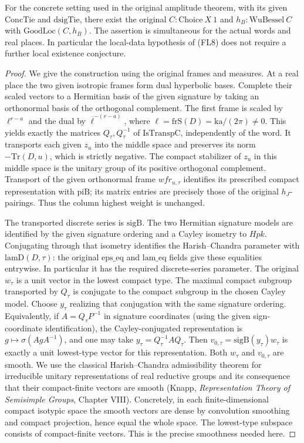\begin{theorem}
\label{thm:flag-local-data}
For the concrete setting used in the original amplitude
theorem, with its given \(\mathrm{ConcTie}\) and
\(\mathrm{dsigTie}\), there exist the original
\(C:\mathrm{Choice}\ X\ 1\) and \(h_B:\mathrm{WuBessel}\ C\)
with \(\mathrm{GoodLoc}(C,h_B)\).
The assertion is simultaneous for the actual words and real
places. In particular the local-data hypothesis of (FL8)
does not require a further local existence conjecture.
\end{theorem}
\begin{proof}
We give the construction using the original frames and measures.
At a real place the two given isotropic frames form dual
hyperbolic bases. Complete their scaled vectors to a Hermitian
basis of the given signature by taking an orthonormal basis
of the orthogonal complement. The first frame is scaled
by \(\ell^{r-a}\) and the dual by
\(\overline{\ell}^{-(r-a)}\), where
\(\ell=\mathrm{frS}(D)=\mathrm{ka}/(2\pi)\ne0\).
This yields exactly the matrices \(Q_\tau,Q_\tau^{-1}\)
of \(\mathrm{IsTranspC}\), independently of the word.
It transports each given \(z_u\) into the middle space
and preserves its norm \(-\mathrm{Tr}(D,u)\), which is
strictly negative. The compact stabilizer of \(z_u\)
in this middle space is the unitary group of its positive
orthogonal complement. Transport of the given orthonormal
frame \(wfr_{u,\tau}\) identifies its prescribed compact
representation with \(\mathrm{piB}\); its matrix entries
are precisely those of the original \(h_J\)-pairings.
Thus the column highest weight is unchanged.

The transported discrete series is \(\mathrm{sigB}\).
The two Hermitian signature models are identified by the
given signature ordering and a Cayley isometry to \(Hpk\).
Conjugating through that isometry identifies the
Harish--Chandra parameter with \(\mathrm{lamD}(D,\tau)\):
the original \(\mathrm{eps\_eq}\) and
\(\mathrm{lam\_eq}\) fields give these equalities entrywise.
In particular it has the required discrete-series parameter.
The original \(w_\tau\) is a unit vector in the lowest
compact type. The maximal compact subgroup transported
by \(Q_\tau\) is conjugate to the compact subgroup in the
chosen Cayley model. Choose \(y_\tau\) realizing that
conjugation with the same signature ordering.
Equivalently, if \(A=Q_\tau P^{-1}\) in signature
coordinates (using the given sign-coordinate identification),
the Cayley-conjugated representation is
\(g\mapsto\sigma(A g A^{-1})\), and one may take
\(y_\tau=Q_\tau^{-1}A Q_\tau\).
Then \(v_{0,\tau}=\mathrm{sigB}(y_\tau)w_\tau\) is
exactly a unit lowest-type vector for this representation.
Both \(w_\tau\) and \(v_{0,\tau}\) are smooth. We use the
classical Harish--Chandra admissibility theorem for
irreducible unitary representations of real reductive
groups and its consequence that their compact-finite
vectors are smooth (Knapp, \emph{Representation Theory
of Semisimple Groups}, Chapter VIII). Concretely, in
each finite-dimensional compact isotypic space the
smooth vectors are dense by convolution smoothing and
compact projection, hence equal the whole space.
The lowest-type subspace consists of compact-finite
vectors. This is the precise smoothness needed here.


\end{proof}
